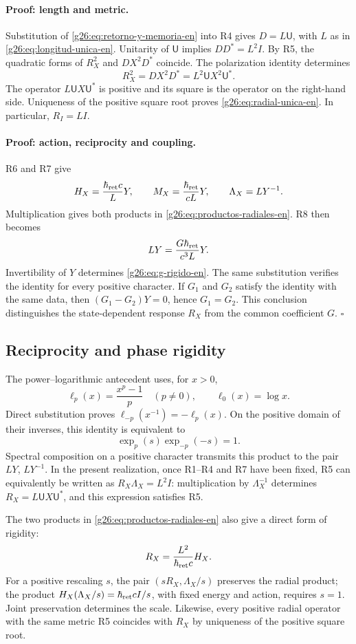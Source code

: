 \paragraph{Proof: length and metric.}
Substitution of \eqref{g26:eq:retorno-y-memoria-en} into R4 gives
\(D=L\mathsf U\), with \(L\) as in
\eqref{g26:eq:longitud-unica-en}. Unitarity of \(\mathsf U\)
implies \(DD^*=L^2I\). By R5, the quadratic forms of \(R_X^2\)
and \(DX^2D^*\) coincide. The polarization identity determines
\[
 R_X^2=DX^2D^*=L^2\mathsf U X^2\mathsf U^*.
\]
The operator \(L\mathsf U X\mathsf U^*\) is positive and its square
is the operator on the right-hand side. Uniqueness of the positive
square root proves \eqref{g26:eq:radial-unica-en}. In particular,
\(R_I=LI\).

\paragraph{Proof: action, reciprocity and coupling.}
R6 and R7 give
\[
 H_X=\frac{\hbar_{\rm ret}c}{L}Y,
 \qquad M_X=\frac{\hbar_{\rm ret}}{cL}Y,
 \qquad \Lambda_X=LY^{-1}.
\]
Multiplication gives both products in
\eqref{g26:eq:productos-radiales-en}. R8 then becomes
\[
 LY=\frac{G\hbar_{\rm ret}}{c^3L}Y.
\]
Invertibility of \(Y\) determines \eqref{g26:eq:g-rigido-en}.
The same substitution verifies the identity for every positive
character. If \(G_1\) and \(G_2\) satisfy the identity with the
same data, then \((G_1-G_2)Y=0\), hence \(G_1=G_2\).
This conclusion distinguishes the state-dependent response \(R_X\)
from the common coefficient \(G\). \hfill\(\square\)

\subsection{Reciprocity and phase rigidity}

The power--logarithmic antecedent uses, for \(x>0\),
\[
 \ell_p(x)=\frac{x^p-1}{p}\quad(p\ne0),
 \qquad \ell_0(x)=\log x.
\]
Direct substitution proves
\(\ell_{-p}(x^{-1})=-\ell_p(x)\). On the positive domain of
their inverses, this identity is equivalent to
\[
 \exp_p(s)\exp_{-p}(-s)=1.
\]
Spectral composition on a positive character transmits this product
to the pair \(LY\), \(LY^{-1}\). In the present realization,
once R1--R4 and R7 have been fixed, R5 can equivalently be written
as \(R_X\Lambda_X=L^2I\): multiplication by
\(\Lambda_X^{-1}\) determines \(R_X=L\mathsf U X\mathsf U^*\),
and this expression satisfies R5.

The two products in \eqref{g26:eq:productos-radiales-en} also give
a direct form of rigidity:
\begin{equation}
 R_X=\frac{L^2}{\hbar_{\rm ret}c}H_X.
 \label{g26:eq:proporcion-operadores-en}
\end{equation}
For a positive rescaling \(s\), the pair
\((sR_X,\Lambda_X/s)\) preserves the radial product; the product
\(H_X(\Lambda_X/s)=\hbar_{\rm ret}cI/s\), with fixed energy and
action, requires \(s=1\). Joint preservation determines the scale.
Likewise, every positive radial operator with the same metric R5
coincides with \(R_X\) by uniqueness of the positive square root.

